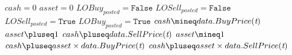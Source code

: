 \begin{algorithmic}[1]
\State $cash = 0$
\State $asset = 0$
	\State $LOBuy_{posted} = \texttt{False}$
	\State $LOSell_{posted} = \texttt{False}$
		\State $LOSell_{posted} = \texttt{True}$
		\State $LOBuy_{posted} = \texttt{True}$
	\EndIf
			\State $cash \mineq data.BuyPrice(\textit{t})$	
			\State $asset \pluseq 1$
			\State $cash \pluseq data.SellPrice(\textit{t})$
			\State $asset \mineq 1$
		\EndIf
	\EndFor
\EndFor
{} 
\State $cash \pluseq asset \times data.BuyPrice(\textit{t})$
\State $cash \pluseq asset \times data.SellPrice(\textit{t})$	
\EndIf
\end{algorithmic}
